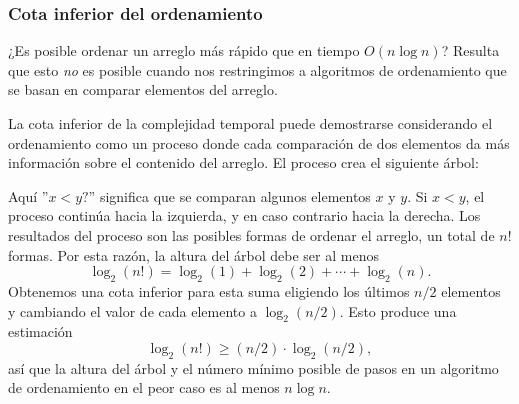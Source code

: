 \subsubsection{Cota inferior del ordenamiento}

¿Es posible ordenar un arreglo más rápido
que en tiempo $O(n \log n)$?
Resulta que esto \emph{no} es posible
cuando nos restringimos a algoritmos de ordenamiento
que se basan en comparar elementos del arreglo.

La cota inferior de la complejidad temporal
puede demostrarse considerando el ordenamiento
como un proceso donde cada comparación de dos elementos
da más información sobre el contenido del arreglo.
El proceso crea el siguiente árbol:

\begin{center}
\end{center}

Aquí ''$x<y?$'' significa que se comparan algunos elementos
$x$ y $y$.
Si $x<y$, el proceso continúa hacia la izquierda,
y en caso contrario hacia la derecha.
Los resultados del proceso son las posibles
formas de ordenar el arreglo, un total de $n!$ formas.
Por esta razón, la altura del árbol
debe ser al menos
\[ \log_2(n!) = \log_2(1)+\log_2(2)+\cdots+\log_2(n).\]
Obtenemos una cota inferior para esta suma
eligiendo los últimos $n/2$ elementos y
cambiando el valor de cada elemento a $\log_2(n/2)$.
Esto produce una estimación
\[ \log_2(n!) \ge (n/2) \cdot \log_2(n/2),\]
así que la altura del árbol y el número mínimo
posible de pasos en un algoritmo de
ordenamiento en el peor caso
es al menos $n \log n$.

